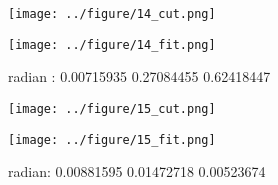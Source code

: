 \documentclass{article}
\begin{document}
\begin{figure}[H]
\begin{minipage}{0.48\linewidth}
  \centerline{\texttt{[image: ../figure/14\_cut.png]}}
\end{minipage}
\hfill
\begin{minipage}{0.48\linewidth}
  \centerline{\texttt{[image: ../figure/14\_fit.png]}}
\end{minipage}
\caption{radian : 0.00715935 0.27084455 0.62418447}
\end{figure}


\begin{figure}[H]
\begin{minipage}{0.48\linewidth}
  \centerline{\texttt{[image: ../figure/15\_cut.png]}}
\end{minipage}
\hfill
\begin{minipage}{0.48\linewidth}
  \centerline{\texttt{[image: ../figure/15\_fit.png]}}
\end{minipage}
\caption{radian: 0.00881595 0.01472718 0.00523674}
\end{figure}
\end{document}
